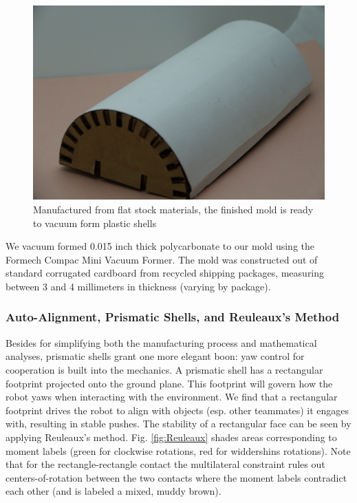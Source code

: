 \documentclass[letterpaper, 10 pt, conference]{ieeeconf}
\begin{document}
\begin{figure}
\centering
\includegraphics[width=0.8\columnwidth]{FinishedMold.jpg}
\caption{\label{fig:Finished Mold}Manufactured from flat stock materials, the finished mold is ready to vacuum form plastic shells}
\end{figure}

We vacuum formed 0.015 inch thick polycarbonate to our mold using the Formech Compac Mini Vacuum Former.
The mold was constructed out of standard corrugated cardboard from recycled shipping packages, measuring between 3 and 4 millimeters in thickness (varying by package).

\subsubsection{Auto-Alignment, Prismatic Shells, and Reuleaux's Method \label{sec:Reuleaux}}
Besides for simplifying both the manufacturing process and mathematical analyses, prismatic shells grant one more elegant boon: yaw control for cooperation is built into the mechanics.
A prismatic shell has a rectangular footprint projected onto the ground plane.
This footprint will govern how the robot yaws when interacting with the environment.
We find that a rectangular footprint drives the robot to align with objects (esp. other teammates) it engages with, resulting in stable pushes.
The stability of a rectangular face can be seen by applying Reuleaux's method.
Fig. \ref{fig:Reuleaux} shades areas corresponding to moment labels (green for clockwise rotations, red for widdershins rotations).
Note that for the rectangle-rectangle contact the multilateral constraint rules out centers-of-rotation between the two contacts where the moment labels contradict each other (and is labeled a mixed, muddy brown).
\end{document}
